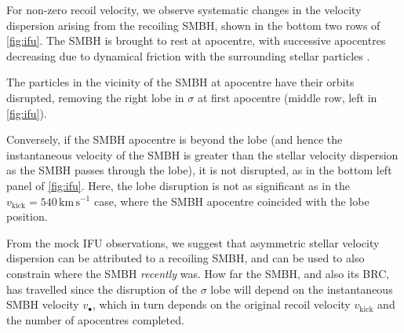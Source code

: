 \documentclass[twocolumn]{aastex631}
\newcommand{\kmps}{\ensuremath{\mathrm{km}\,\mathrm{s}^{-1}} }%
\newcommand{\vk}{\ensuremath{v_\mathrm{kick}}}                %
\begin{document}
For non-zero recoil velocity, we observe systematic changes in the velocity dispersion arising from the recoiling SMBH, shown in the bottom two rows of \autoref{fig:ifu}.
The SMBH is brought to rest at apocentre, with successive apocentres decreasing due to dynamical friction with the surrounding stellar particles \citep{chandrasekhar1943}.

The particles in the vicinity of the SMBH at apocentre have their orbits disrupted, removing the right lobe in $\sigma$ at first apocentre (middle row, left in \autoref{fig:ifu}).

Conversely, if the SMBH apocentre is beyond the lobe (and hence the instantaneous velocity of the SMBH is greater than the stellar velocity dispersion as the SMBH passes through the lobe), it is not disrupted, as in the bottom left panel of \autoref{fig:ifu}.
Here, the lobe disruption is not as significant as in the $\vk=540\,\kmps$ case, where the SMBH apocentre coincided with the lobe position.


From the mock IFU observations, we suggest that asymmetric stellar velocity dispersion can be attributed to a recoiling SMBH, and can be used to also constrain where the SMBH \textit{recently} was.
How far the SMBH, and also its BRC, has travelled since the disruption of the $\sigma$ lobe will depend on the instantaneous SMBH velocity $v_\bullet$, which in turn depends on the original recoil velocity $\vk$ and the number of apocentres completed.
\end{document}
